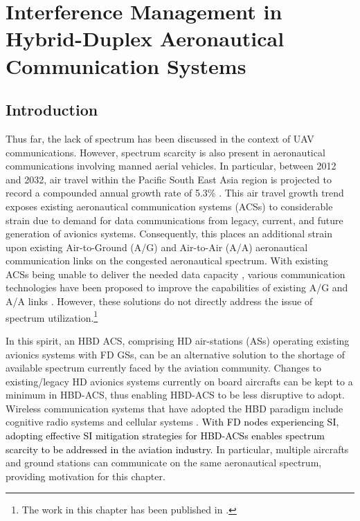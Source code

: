 \chapter{Interference Management in Hybrid-Duplex Aeronautical Communication Systems}
\label{chap:interference_management_HBD_ACS}
\section{Introduction}

Thus far, the lack of spectrum has been discussed in the context of UAV communications. However, spectrum scarcity is also present in aeronautical communications involving manned aerial vehicles. In particular, between 2012 and 2032, air travel within the Pacific South East Asia region is projected to record a compounded annual growth rate of 5.3\% \cite{icao2016long}. This air travel growth trend exposes existing aeronautical communication systems (ACSs) to considerable strain due to demand for data communications from legacy, current, and future generation of avionics systems. Consequently, this places an additional strain upon existing Air-to-Ground (A/G) and Air-to-Air (A/A) aeronautical communication links on the congested aeronautical spectrum. With existing ACSs being unable to deliver the needed data capacity \cite{neji2013survey}, various communication technologies have been proposed to improve the capabilities of existing A/G and A/A links \cite{neji2013survey,ernest2016efficiency}. However, these solutions do not directly address the issue of spectrum utilization.\footnote{The work in this chapter has been published in \cite{ernest2019outage}.}

In this spirit, an HBD ACS, comprising HD air-stations (ASs) operating existing avionics systems with FD GSs, can be an alternative solution to the shortage of available spectrum currently faced by the aviation community. Changes to existing/legacy HD avionics systems currently on board aircrafts can be kept to a minimum in HBD-ACS, thus enabling HBD-ACS to be less disruptive to adopt. Wireless communication systems that have adopted the HBD paradigm include cognitive radio systems \cite{li2014linear} and cellular systems \cite{mohammadi2015full, jang2015spatial, cirik2018robust}. \textcolor{black}{With FD nodes experiencing SI, adopting effective SI mitigation strategies for HBD-ACSs enables spectrum scarcity to be addressed in the aviation industry}. In particular, multiple aircrafts and ground stations can communicate on the same aeronautical spectrum, providing motivation for this chapter.

